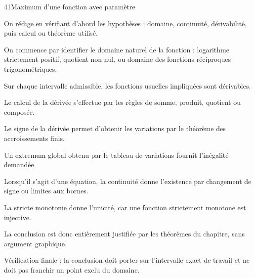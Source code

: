 \documentclass[11pt,a4paper]{article}
\begin{document}
\begin{corrbox}{41}{Maximum d'une fonction avec paramètre}

\begin{methodebox}
On rédige en vérifiant d'abord les hypothèses : domaine, continuité, dérivabilité, puis calcul ou théorème utilisé.
\end{methodebox}

On commence par identifier le domaine naturel de la fonction : logarithme strictement positif, quotient non nul, ou domaine des fonctions réciproques trigonométriques.


Sur chaque intervalle admissible, les fonctions usuelles impliquées sont dérivables.


Le calcul de la dérivée s'effectue par les règles de somme, produit, quotient ou composée.


Le signe de la dérivée permet d'obtenir les variations par le théorème des accroissements finis.


Un extremum global obtenu par le tableau de variations fournit l'inégalité demandée.


Lorsqu'il s'agit d'une équation, la continuité donne l'existence par changement de signe ou limites aux bornes.


La stricte monotonie donne l'unicité, car une fonction strictement monotone est injective.


La conclusion est donc entièrement justifiée par les théorèmes du chapitre, sans argument graphique.


\begin{attentionbox}
Vérification finale : la conclusion doit porter sur l'intervalle exact de travail et ne doit pas franchir un point exclu du domaine.
\end{attentionbox}

\end{corrbox}
\end{document}
